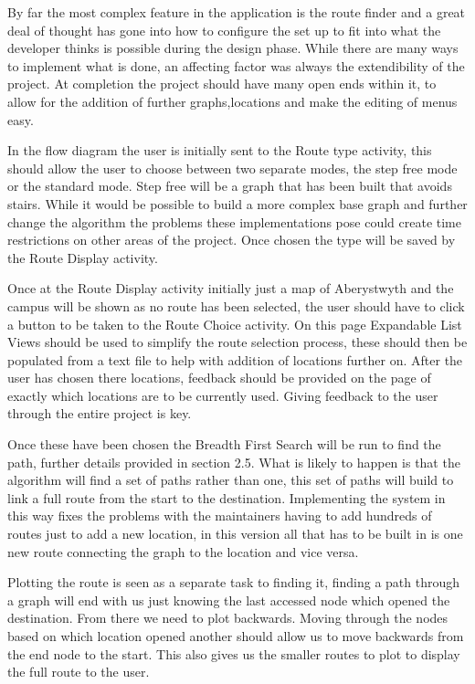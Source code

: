 By far the most complex feature in the application is the route finder and a great deal of thought has gone into how to configure the set up to fit into what the developer thinks is possible during the design phase. While there are many ways to implement what is done, an affecting factor was always the extendibility of the project. At completion the project should have many open ends within it, to allow for the addition of further graphs,locations and make the editing of menus easy. 

In the flow diagram the user is initially sent to the Route type activity, this should allow the user to choose between two separate modes, the step free mode or the standard mode. Step free will be a graph that has been built that avoids stairs. While it would be possible to build a more complex base graph and further change the algorithm the problems these implementations pose could create time restrictions on other areas of the project. Once chosen the type will be saved by the Route Display activity. 

Once at the Route Display activity initially just a map of Aberystwyth and the campus will be shown as no route has been selected, the user should have to click a button to be taken to the Route Choice activity. On this page Expandable List Views should be used to simplify the route selection process, these should then be populated from a text file to help with addition of locations further on. After the user has chosen there locations, feedback should be provided on the page of exactly which locations are to be currently used. Giving feedback to the user through the entire project is key.

Once these have been chosen the Breadth First Search will be run to find the path, further details provided in section 2.5. What is likely to happen is that the algorithm will find a set of paths rather than one, this set of paths will build to link a full route from the start to the destination. Implementing the system in this way fixes the problems with the maintainers having to add hundreds of routes just to add a new location, in this version all that has to be built in is one new route connecting the graph to the location and vice versa. 

Plotting the route is seen as a separate task to finding it, finding a path through a graph will end with us just knowing the last accessed node which opened the destination. From there we need to plot backwards. Moving through the nodes based on which location opened another should allow us to move backwards from the end node to the start. This also gives us the smaller routes to plot to display the full route to the user.

